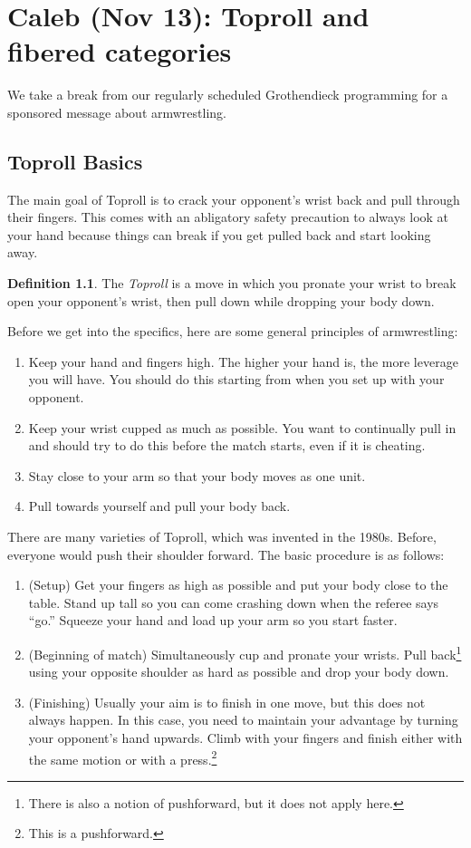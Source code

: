 \documentclass[leqno, openany]{memoir}
\theoremstyle{definition}
\newtheorem{defn}[thm]{Definition}
\theoremstyle{remark}
\theoremstyle{plain}
\theoremstyle{definition}
\theoremstyle{remark}
\begin{document}
\chapter{Caleb (Nov 13): Toproll and fibered categories}%
\label{cha:caleb_nov_13_toproll_and_fibered_categories}

We take a break from our regularly scheduled Grothendieck programming for a
sponsored message about armwrestling.

\section{Toproll Basics}%

The main goal of Toproll is to crack your opponent's wrist back and pull
through their fingers. This comes with an abligatory safety precaution to
always look at your hand because things can break if you get pulled back and
start looking away.

\begin{defn} The \textit{Toproll} is a move in which you pronate your wrist to
break open your opponent's wrist, then pull down while dropping your body down.
\end{defn}

Before we get into the specifics, here are some general principles of
armwrestling: \begin{enumerate} \item Keep your hand and fingers high. The
    higher your hand is, the more leverage you will have. You should do this
    starting from when you set up with your opponent.  \item Keep your wrist
    cupped as much as possible. You want to continually pull in and should try
    to do this before the match starts, even if it is cheating.  \item Stay
    close to your arm so that your body moves as one unit.  \item Pull towards
    yourself and pull your body back.  \end{enumerate}

There are many varieties of Toproll, which was invented in the 1980s. Before,
everyone would push their shoulder forward. The basic procedure is as follows:
\begin{enumerate} \item (Setup) Get your fingers as high as possible and put
    your body close to the table. Stand up tall so you can come crashing down
    when the referee says ``go.'' Squeeze your hand and load up your arm so you
    start faster.  \item (Beginning of match) Simultaneously cup and pronate
    your wrists. Pull back\footnote{There is also a notion of pushforward, but
    it does not apply here.} using your opposite shoulder as hard as possible
    and drop your body down.  \item (Finishing) Usually your aim is to finish
    in one move, but this does not always happen. In this case, you need to
    maintain your advantage by turning your opponent's hand upwards. Climb with
    your fingers and finish either with the same motion or with a
    press.\footnote{This is a pushforward.} \end{enumerate}
\end{document}
